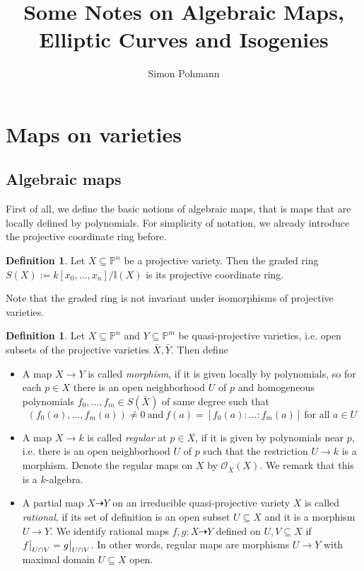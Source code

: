 \documentclass{scrartcl}
\title{Some Notes on Algebraic Maps, Elliptic Curves and Isogenies}
\author{Simon Pohmann}
\newcommand{\I}{\mathbb{I}}
\newcommand\restr[2]{{
    \left.\kern-\nulldelimiterspace
    #1
    \vphantom{\big|}
    \right|_{#2}
}}
\theoremstyle{definition}
\newtheorem{definition}[prop]{Definition}
\begin{document}
\maketitle

\tableofcontents

\section{Maps on varieties}

\subsection{Algebraic maps}
First of all, we define the basic notions of algebraic maps, that is maps that are locally defined by polynomials.
For simplicity of notation, we already introduce the projective coordinate ring before.
\begin{definition}
    Let $X \subseteq \mathbb{P}^n$ be a projective variety. 
    Then the graded ring $S(X) := k[x_0, ..., x_n] / \I(X)$ is its projective coordinate ring.
\end{definition}
Note that the graded ring is not invariant under isomorphisms of projective varieties.
\begin{definition}
    Let $X \subseteq \mathbb{P}^n$ and $Y \subseteq \mathbb{P}^m$ be quasi-projective varieties, i.e. open subsets of the projective varieties $\bar{X}, \bar{Y}$.
    Then define
    \begin{itemize}
        \item A map $X \to Y$ is called \emph{morphism}, if it is given locally by polynomials, so for each $p \in X$ there is an open neighborhood $U$ of $p$ and homogeneous polynomials $f_0, ..., f_m \in S(\bar{X})$ of same degree such that
        \begin{equation*}
            (f_0(a), ..., f_m(a)) \neq 0 \ \text{and} \ f(a) = [f_0(a) : ... : f_m(a)] \ \text{for all $a \in U$}
        \end{equation*}
        \item A map $X \to k$ is called \emph{regular} at $p \in X$, if it is given by polynomials near $p$, i.e. there is an open neighborhood $U$ of $p$ such that the restriction $U \to k$ is a morphism.
        Denote the regular maps on $X$ by $\mathcal{O}_{\bar{X}}(X)$.
        We remark that this is a $k$-algebra.
        \item A partial map $X \dashrightarrow Y$ on an irreducible quasi-projective variety $X$ is called \emph{rational}, if its set of definition is an open subset $U \subseteq X$ and it is a morphism $U \to Y$.
        We identify rational maps $f, g: X \dashrightarrow Y$ defined on $U, V \subseteq X$ if $\restr{f}{U \cap V} = \restr{g}{U \cap V}$.
        In other words, regular maps are morphisms $U \to Y$ with maximal domain $U \subseteq X$ open.
    \end{itemize}
\end{definition}
\end{document}
